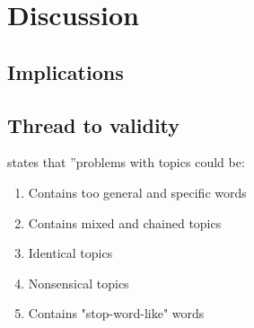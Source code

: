 \chapter{Discussion}

\section{Implications}

\section{Thread to validity}
\cite{boyd2014care} states that ''problems with topics could be: 
    \begin{enumerate}
        \item Contains too general and specific words
        \item Contains mixed and chained topics
        \item Identical topics
        \item Nonsensical topics
        \item Contains "stop-word-like" words
    \end{enumerate}

